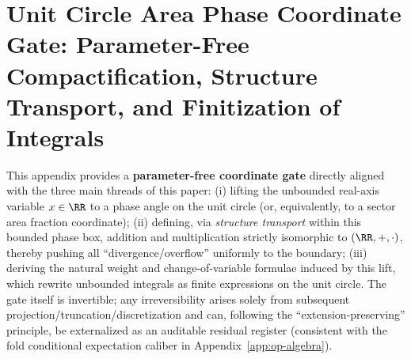 \section{Unit Circle Area Phase Coordinate Gate: Parameter-Free Compactification, Structure Transport, and Finitization of Integrals}\label{app:unit-circle-phase-gate}
This appendix provides a \textbf{parameter-free coordinate gate} directly aligned with the three main threads of this paper:
(i) lifting the unbounded real-axis variable \(x\in\RR\) to a phase angle on the unit circle (or, equivalently, to a sector area fraction coordinate);
(ii) defining, via \emph{structure transport} within this bounded phase box, addition and multiplication strictly isomorphic to \((\RR,+,\cdot)\), thereby pushing all ``divergence/overflow'' uniformly to the boundary;
(iii) deriving the natural weight and change-of-variable formulae induced by this lift, which rewrite unbounded integrals as finite expressions on the unit circle.
The gate itself is invertible; any irreversibility arises solely from subsequent projection/truncation/discretization and can, following the ``extension-preserving'' principle, be externalized as an auditable residual register (consistent with the fold conditional expectation caliber in Appendix~\ref{app:op-algebra}).

















